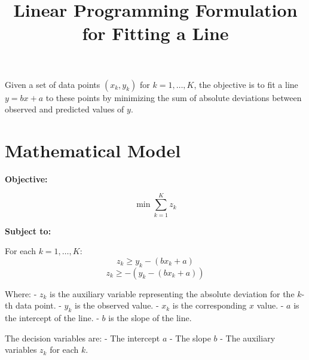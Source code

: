 \documentclass{article}
\begin{document}
\title{Linear Programming Formulation for Fitting a Line}
\author{}
\date{}
\maketitle

Given a set of data points \((x_k, y_k)\) for \(k=1,\ldots,K\), the objective is to fit a line \(y = bx + a\) to these points by minimizing the sum of absolute deviations between observed and predicted values of \(y\).

\section*{Mathematical Model}

\textbf{Objective:}

\[
\min \sum_{k=1}^{K} z_k
\]

\textbf{Subject to:}

For each \(k = 1, \ldots, K\):
\[
z_k \geq y_k - (bx_k + a)
\]
\[
z_k \geq -(y_k - (bx_k + a))
\]

Where:
- \( z_k \) is the auxiliary variable representing the absolute deviation for the \(k\)-th data point.
- \( y_k \) is the observed value.
- \( x_k \) is the corresponding \(x\) value.
- \( a \) is the intercept of the line.
- \( b \) is the slope of the line.

The decision variables are:
- The intercept \(a\)
- The slope \(b\)
- The auxiliary variables \(z_k\) for each \(k\).
\end{document}
